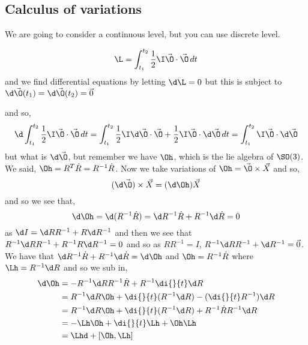
\subsection{Calculus of variations}
We are going to consider a continuous level, but you can use discrete level.
\begin{nthm}
  $$ \L = \int_{t_1}^{t_2} \frac{1}{2}\I\vec \O \cdot \vec\O \,dt $$
  and we find differential equations by letting $\d\L = 0$ but this is subject to $\d\vec\O(t_1) = \d\vec\O(t_2) = \vec 0$
\end{nthm}
and so,
$$ \d\int_{t_1}^{t_2} \frac{1}{2}\I\vec\O \cdot \vec\O\, dt = \int_{t_1}^{t_2} \frac{1}{2}\I\d\vec\O \cdot \vec\O + \frac{1}{2}\I\vec\O \cdot \d\vec\O \, dt  = \int_{t_1}^{t_2}\I\vec\O \cdot \d\vec\O$$
but what is $\d\vec\O$, but remember we have $\Oh$, which is the lie algebra of $\SO(3)$. We said, $\Oh = R^T\dot R = R^{-1}\dot R$. Now we take variations of $\Oh = \vec\O \times \vec X$ and so,
$$ (\d \vec \O)\times\vec X = (\d\Oh) \vec X $$
and so we see that,
$$ \d\Oh = \d(R^{-1}\dot R) = \d R^{-1}\dot R + R^{-1}\d\dot R = 0 $$
as $\d I = \d RR^{-1} + R\d R^{-1}$ and then we see that $R^{-1}\d R R^{-1} + R^{-1}R \d R^{-1} = 0$ and so as $RR^{-1} = I$, $R^{-1}\d RR^{-1} + \d R^{-1} = \vec 0$. We have that $\d R^{-1}\dot R + R^{-1}\d \dot R = \d \Oh$ and $\Oh = R^{-1}\dot R$ where $\Lh = R^{-1}\d R$ and so we sub in,
\begin{align*}
  \d\Oh &= -R^{-1}\d R R^{-1}\dot R + R^{-1}\di{}{t}\d R\\
  &= R^{-1}\d R \Oh + \di{}{t}(R^{-1}\d R) - (\di{}{t}R^{-1})\d R\\
  &= R^{-1}\d R \Oh + \di{}{t}(R^{-1}\d R) + R^{-1}\dot R R^{-1}\d R\\
  &= - \Lh\Oh + \di{}{t}\Lh + \Oh\Lh\\
  &=\Lhd + [\Oh, \Lh]
\end{align*}

